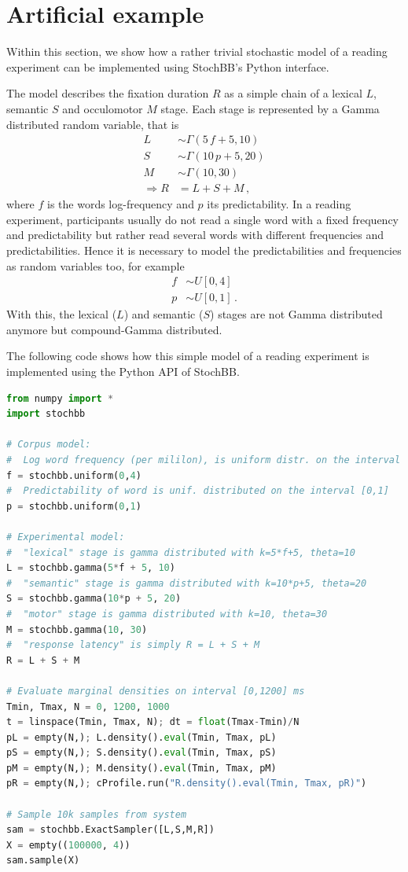 \section{Artificial example} \label{sec:example}
Within this section, we show how a rather trivial stochastic model of a reading experiment can be implemented using StochBB's Python interface.

The model describes the fixation duration $R$ as a simple chain of a lexical $L$, semantic $S$ and occulomotor $M$ stage. Each stage is represented by a Gamma distributed random variable, that is
\begin{align*}
 L &\sim \Gamma(5\,f+5, 10)\\
 S &\sim \Gamma(10\,p+5, 20)\\
 M &\sim \Gamma(10, 30)\\
 \Rightarrow R &= L+S+M\,,
\end{align*} 
where $f$ is the words log-frequency and $p$ its predictability. In a reading experiment, participants usually do not read a single word with a fixed frequency and predictability but rather read several words with different frequencies and predictabilities. Hence it is necessary to model the predictabilities and frequencies as random variables too, for example
\begin{align*}
 f &\sim U[0,4]\\
 p &\sim U[0,1]\,.
\end{align*}
With this, the lexical ($L$) and semantic ($S$) stages are not Gamma distributed anymore but compound-Gamma distributed. 

The following code shows how this simple model of a reading experiment is implemented using the Python API of StochBB.

\begin{lstlisting}[language=Python]
from numpy import *
import stochbb

# Corpus model:
#  Log word frequency (per mililon), is uniform distr. on the interval [0,4]
f = stochbb.uniform(0,4)
#  Predictability of word is unif. distributed on the interval [0,1]
p = stochbb.uniform(0,1)

# Experimental model:
#  "lexical" stage is gamma distributed with k=5*f+5, theta=10
L = stochbb.gamma(5*f + 5, 10)
#  "semantic" stage is gamma distributed with k=10*p+5, theta=20
S = stochbb.gamma(10*p + 5, 20)
#  "motor" stage is gamma distributed with k=10, theta=30
M = stochbb.gamma(10, 30)
#  "response latency" is simply R = L + S + M
R = L + S + M

# Evaluate marginal densities on interval [0,1200] ms
Tmin, Tmax, N = 0, 1200, 1000
t = linspace(Tmin, Tmax, N); dt = float(Tmax-Tmin)/N
pL = empty(N,); L.density().eval(Tmin, Tmax, pL)
pS = empty(N,); S.density().eval(Tmin, Tmax, pS)
pM = empty(N,); M.density().eval(Tmin, Tmax, pM)
pR = empty(N,); cProfile.run("R.density().eval(Tmin, Tmax, pR)")

# Sample 10k samples from system
sam = stochbb.ExactSampler([L,S,M,R])
X = empty((100000, 4))
sam.sample(X)
\end{lstlisting}

